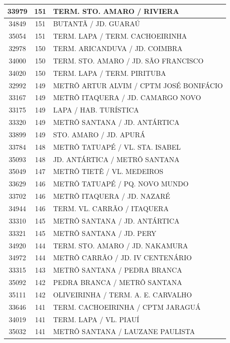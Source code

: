 \documentclass[
	12pt,				%
	oneside,			%
	a4paper,			%
	english,			%
	brazil				%
	]{abntex2ppgsi}
\begin{document}
{{{\begin{apendicesenv}
\begin{longtable}{c|c|p{7cm}}
 \hline 
33979 &	151 &	TERM. STO. AMARO / RIVIERA \\ 
 \hline 
34849 &	151 &	BUTANTÃ / JD. GUARAÚ \\ 
 \hline 
35054 &	151 &	TERM. LAPA / TERM. CACHOEIRINHA \\ 
 \hline 
32978 &	150 &	TERM. ARICANDUVA / JD. COIMBRA \\ 
 \hline 
34000 &	150 &	TERM. STO. AMARO / JD. SÃO FRANCISCO \\ 
 \hline 
34020 &	150 &	TERM. LAPA / TERM. PIRITUBA \\ 
 \hline 
32992 &	149 &	METRÔ ARTUR ALVIM / CPTM JOSÉ BONIFÁCIO \\ 
 \hline 
33167 &	149 &	METRÔ ITAQUERA / JD. CAMARGO NOVO \\ 
 \hline 
33175 &	149 &	LAPA / HAB. TURÍSTICA \\ 
 \hline 
33320 &	149 &	METRÔ SANTANA / JD. ANTÁRTICA \\ 
 \hline 
33899 &	149 &	STO. AMARO / JD. APURÁ \\ 
 \hline 
33784 &	148 &	METRÔ TATUAPÉ / VL. STA. ISABEL \\ 
 \hline 
35093 &	148 &	JD. ANTÁRTICA / METRÔ SANTANA \\ 
 \hline 
35049 &	147 &	METRÔ TIETÊ / VL. MEDEIROS \\ 
 \hline 
33629 &	146 &	METRÔ TATUAPÉ / PQ. NOVO MUNDO \\ 
 \hline 
33702 &	146 &	METRÔ ITAQUERA / JD. NAZARÉ \\ 
 \hline 
34944 &	146 &	TERM. VL. CARRÃO / ITAQUERA \\ 
 \hline 
33310 &	145 &	METRÔ SANTANA / JD. ANTÁRTICA \\ 
 \hline 
33321 &	145 &	METRÔ SANTANA / JD. PERY \\ 
 \hline 
34920 &	144 &	TERM. STO. AMARO / JD. NAKAMURA \\ 
 \hline 
34972 &	144 &	METRÔ CARRÃO / JD. IV CENTENÁRIO \\ 
 \hline 
33315 &	143 &	METRÔ SANTANA / PEDRA BRANCA \\ 
 \hline 
35092 &	142 &	PEDRA BRANCA / METRÔ SANTANA \\ 
 \hline 
35111 &	142 &	OLIVEIRINHA / TERM. A. E. CARVALHO \\ 
 \hline 
33646 &	141 &	TERM. CACHOEIRINHA / CPTM JARAGUÁ \\ 
 \hline 
34019 &	141 &	TERM. LAPA / VL. PIAUÍ \\ 
 \hline 
35032 &	141 &	METRÔ SANTANA / LAUZANE PAULISTA \\ 

\end{longtable}
\end{apendicesenv}}}}
\end{document}
